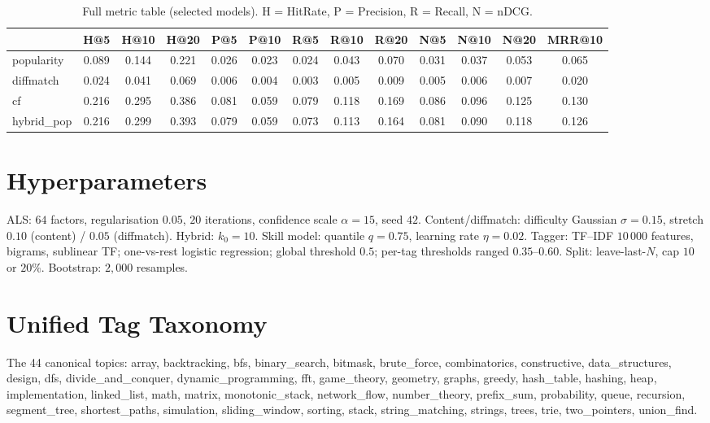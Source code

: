 \documentclass[12pt,a4paper]{article}
\newcommand{\ndcg}{nDCG}
\begin{document}
\begin{table}[h]
\centering
\caption{Full metric table (selected models). H = HitRate, P = Precision, R = Recall, N =
\ndcg{}.}
\label{tab:full}
\scriptsize
\begin{tabular}{lcccccccccccc}
\toprule
 & H@5 & H@10 & H@20 & P@5 & P@10 & R@5 & R@10 & R@20 & N@5 & N@10 & N@20 & MRR@10 \\
\midrule
popularity  & 0.089 & 0.144 & 0.221 & 0.026 & 0.023 & 0.024 & 0.043 & 0.070 & 0.031 & 0.037 & 0.053 & 0.065 \\
diffmatch   & 0.024 & 0.041 & 0.069 & 0.006 & 0.004 & 0.003 & 0.005 & 0.009 & 0.005 & 0.006 & 0.007 & 0.020 \\
cf          & 0.216 & 0.295 & 0.386 & 0.081 & 0.059 & 0.079 & 0.118 & 0.169 & 0.086 & 0.096 & 0.125 & 0.130 \\
hybrid\_pop & 0.216 & 0.299 & 0.393 & 0.079 & 0.059 & 0.073 & 0.113 & 0.164 & 0.081 & 0.090 & 0.118 & 0.126 \\
\bottomrule
\end{tabular}
\end{table}

\section{Hyperparameters}
\label{app:hyper}
ALS: $64$ factors, regularisation $0.05$, $20$ iterations, confidence scale $\alpha=15$,
seed $42$. Content/diffmatch: difficulty Gaussian $\sigma=0.15$, stretch $0.10$ (content)
/ $0.05$ (diffmatch). Hybrid: $k_0=10$. Skill model: quantile $q=0.75$, learning rate
$\eta=0.02$. Tagger: TF--IDF $10\,000$ features, bigrams, sublinear TF; one-vs-rest
logistic regression; global threshold $0.5$; per-tag thresholds ranged $0.35$--$0.60$.
Split: leave-last-$N$, cap $10$ or $20\%$. Bootstrap: $2{,}000$ resamples.

\section{Unified Tag Taxonomy}
\label{app:taxonomy}
The 44 canonical topics: array, backtracking, bfs, binary\_search, bitmask, brute\_force,
combinatorics, constructive, data\_structures, design, dfs, divide\_and\_conquer,
dynamic\_programming, fft, game\_theory, geometry, graphs, greedy, hash\_table, hashing,
heap, implementation, linked\_list, math, matrix, monotonic\_stack, network\_flow,
number\_theory, prefix\_sum, probability, queue, recursion, segment\_tree, shortest\_paths,
simulation, sliding\_window, sorting, stack, string\_matching, strings, trees, trie,
two\_pointers, union\_find.
\end{document}
